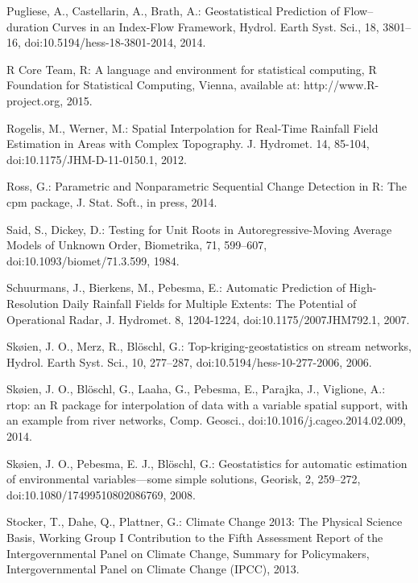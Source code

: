 \begin{thebibliography}
\bibitem{} \hangindent=1cm Pugliese, A., Castellarin, A., Brath, A.: Geostatistical Prediction of Flow–duration Curves in an Index-Flow Framework, Hydrol. Earth Syst. Sci., 18, 3801–16, doi:10.5194/hess-18-3801-2014, 2014.

\bibitem{} \hangindent=1cm R Core Team, R: A language and environment for statistical computing, R Foundation for Statistical Computing, Vienna, available at: http://www.R-project.org, 2015.

\bibitem{} \hangindent=1cm Rogelis, M., Werner, M.: Spatial Interpolation for Real-Time Rainfall Field Estimation in Areas with Complex Topography. J. Hydromet. 14, 85-104, doi:10.1175/JHM-D-11-0150.1, 2012.

\bibitem{} \hangindent=1cm Ross, G.: Parametric and Nonparametric Sequential Change Detection in R: The cpm package, J. Stat. Soft., in press, 2014.

\bibitem{} \hangindent=1cm Said, S., Dickey, D.: Testing for Unit Roots in Autoregressive-Moving Average Models of Unknown Order, Biometrika, 71, 599–607, doi:10.1093/biomet/71.3.599, 1984.

\bibitem{} \hangindent=1cm Schuurmans, J., Bierkens, M., Pebesma, E.: Automatic Prediction of High-Resolution Daily Rainfall Fields for Multiple Extents: The Potential of Operational Radar, J. Hydromet. 8, 1204-1224, doi:10.1175/2007JHM792.1, 2007.

\bibitem{} \hangindent=1cm Skøien, J. O., Merz, R., Blöschl, G.: Top-kriging-geostatistics on stream networks, Hydrol. Earth Syst. Sci., 10, 277–287, doi:10.5194/hess-10-277-2006, 2006.

\bibitem{} \hangindent=1cm Skøien, J. O., Blöschl, G., Laaha, G., Pebesma, E., Parajka, J., Viglione, A.: rtop: an R package for interpolation of data with a variable spatial support, with an example from river networks, Comp. Geosci., doi:10.1016/j.cageo.2014.02.009, 2014.

\bibitem{} \hangindent=1cm Skøien, J. O., Pebesma, E. J., Blöschl, G.: Geostatistics for automatic estimation of environmental variables—some simple solutions, Georisk, 2, 259–272, doi:10.1080/17499510802086769, 2008.

\bibitem{} \hangindent=1cm Stocker, T., Dahe, Q., Plattner, G.: Climate Change 2013: The Physical Science Basis, Working Group I Contribution to the Fifth Assessment Report of the Intergovernmental Panel on Climate Change, Summary for Policymakers, Intergovernmental Panel on Climate Change (IPCC), 2013.


\end{thebibliography}

